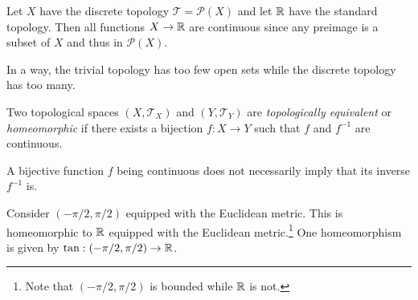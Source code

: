 \begin{example}
  Let $X$ have the discrete topology
  $\mathcal{T} = \mathcal{P}(X)$ and let
  $\mathbb{R}$ have the standard topology.
  Then all functions $X \to \mathbb{R}$ are continuous
  since any preimage is a subset of $X$ and thus
  in $\mathcal{P}(X)$.
\end{example}

\begin{remark}
  In a way, the trivial topology has too few
  open sets while the discrete topology has too many.
\end{remark}

\begin{definition}
  Two topological spaces $(X, \mathcal{T}_X)$ and
  $(Y, \mathcal{T}_Y)$ are
  \emph{topologically equivalent} or
  \emph{homeomorphic} if there exists a
  bijection $f : X \to Y$ such that
  $f$ and $f^{-1}$ are continuous.
\end{definition}

\begin{remark}
  A bijective function $f$ being continuous does
  not necessarily imply that its inverse $f^{-1}$ is.
\end{remark}

\begin{example}
  Consider $(-\pi / 2, \pi / 2)$ equipped with the
  Euclidean metric. This is homeomorphic to $\mathbb{R}$
  equipped with the Euclidean metric.\footnote{Note that $(-\pi / 2, \pi / 2)$ is bounded while $\mathbb{R}$ is not.} One
  homeomorphism is given by $\tan : (-\pi / 2, \pi / 2) \to \mathbb{R}$.
\end{example}
